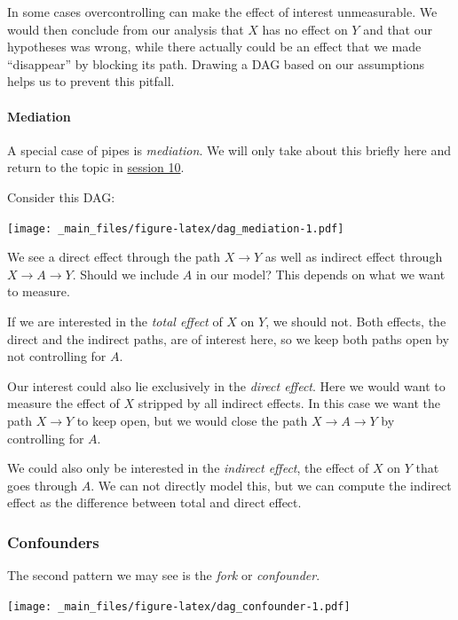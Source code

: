 \documentclass[
]{book}
\begin{document}
In some cases overcontrolling can make the effect of interest
unmeasurable. We would then conclude from our analysis that \(X\) has no
effect on \(Y\) and that our hypotheses was wrong, while there actually
could be an effect that we made ``disappear'' by blocking its path.
Drawing a DAG based on our assumptions helps us to prevent this pitfall.

\hypertarget{mediation}{%
\paragraph{Mediation}\label{mediation}}

A special case of pipes is \emph{mediation}. We will only take about this
briefly here and return to the topic in \protect\hyperlink{med}{session 10}.

Consider this DAG:

\texttt{[image: \_main\_files/figure-latex/dag\_mediation-1.pdf]}

We see a direct effect through the path \(X \rightarrow Y\) as well as
indirect effect through \(X \rightarrow A \rightarrow Y\). Should we
include \(A\) in our model? This depends on what we want to measure.

If we are interested in the \emph{total effect} of \(X\) on \(Y\), we should not.
Both effects, the direct and the indirect paths, are of interest here,
so we keep both paths open by not controlling for \(A\).

Our interest could also lie exclusively in the \emph{direct effect}. Here we
would want to measure the effect of \(X\) stripped by all indirect
effects. In this case we want the path \(X \rightarrow Y\) to keep open,
but we would close the path \(X \rightarrow A \rightarrow Y\) by
controlling for \(A\).

We could also only be interested in the \emph{indirect effect}, the effect of
\(X\) on \(Y\) that goes through \(A\). We can not directly model this, but we
can compute the indirect effect as the difference between total and
direct effect.

\hypertarget{confounders}{%
\subsubsection{Confounders}\label{confounders}}

The second pattern we may see is the \emph{fork} or \emph{confounder}.

\texttt{[image: \_main\_files/figure-latex/dag\_confounder-1.pdf]}
\end{document}

